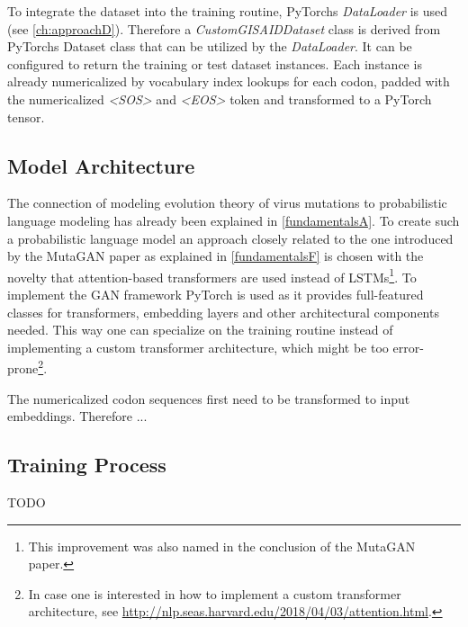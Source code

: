 To integrate the dataset into the training routine, PyTorchs \textit{DataLoader} is used (see \autoref{ch:approachD}). Therefore a \textit{CustomGISAIDDataset} class is derived from PyTorchs Dataset class that can be utilized by the \textit{DataLoader}. It can be configured to return the training or test dataset instances. Each instance is already numericalized by vocabulary index lookups for each codon, padded with the numericalized \textit{<SOS>} and \textit{<EOS>} token and transformed to a PyTorch tensor. 

\subsection{Model Architecture}  \label{ch:approachC}

The connection of modeling evolution theory of virus mutations to probabilistic language modeling has already been explained in \autoref{fundamentalsA}. To create such a probabilistic language model an approach closely related to the one introduced by the MutaGAN paper \cite{Berman2020} as explained in \autoref{fundamentalsF} is chosen with the novelty that attention-based transformers are used instead of \acp{LSTM}\footnote{This improvement was also named in the conclusion of the MutaGAN paper.}. To implement the \ac{GAN} framework PyTorch is used as it provides full-featured classes for transformers, embedding layers and other architectural components needed. This way one can specialize on the training routine instead of implementing a custom transformer architecture, which might be too error-prone\footnote{In case one is interested in how to implement a custom transformer architecture, see \url{http://nlp.seas.harvard.edu/2018/04/03/attention.html}.}. 

The numericalized codon sequences first need to be transformed to input embeddings. Therefore ...


\subsection{Training Process} \label{ch:approachD}

TODO


\newpage
